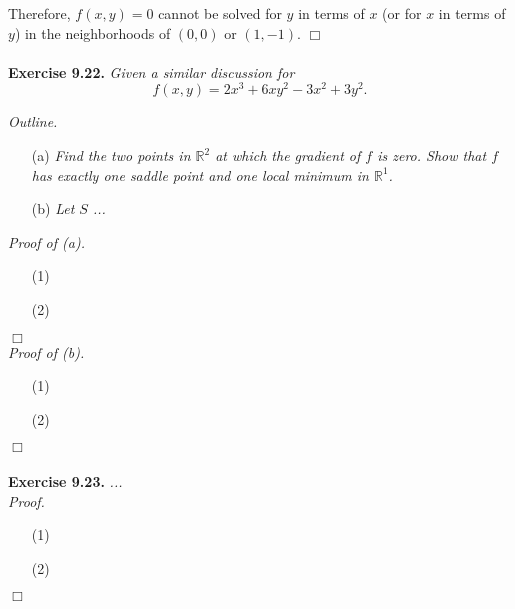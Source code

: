 \documentclass{article}
\begin{document}
Therefore, $f(x,y) = 0$ cannot be solved
for $y$ in terms of $x$ (or for $x$ in terms of $y$)
in the neighborhoods of $(0,0)$ or $(1,-1)$.
$\Box$ \\\\






\textbf{Exercise 9.22.}
\emph{Given a similar discussion for}
\[
  f(x,y) = 2x^3+6xy^2-3x^2+3y^2.
\]



\emph{Outline.}
\begin{enumerate}
\item[(a)]
  \emph{Find the two points in $\mathbb{R}^2$ at which the gradient of $f$ is zero.
  Show that $f$ has exactly one saddle point and one local minimum in $\mathbb{R}^1$.}

\item[(b)]
  \emph{Let $S$ ...} \\
\end{enumerate}



\emph{Proof of (a).}
\begin{enumerate}
\item[(1)]
\item[(2)]
\end{enumerate}
$\Box$ \\



\emph{Proof of (b).}
\begin{enumerate}
\item[(1)]
\item[(2)]
\end{enumerate}
$\Box$ \\\\






\textbf{Exercise 9.23.}
\emph{...} \\

\emph{Proof.}
\begin{enumerate}
\item[(1)]
\item[(2)]

\end{enumerate}
$\Box$ \\\\
\end{document}
